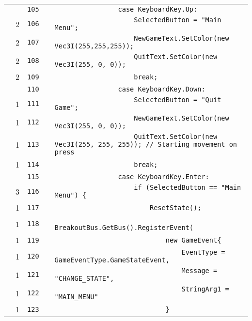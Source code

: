 \documentclass[a4paper,landscape,10pt]{article}
\begin{document}
\begin{longtable}[l]{lrrll}
\cellcolor{gray} &  & \verb~105~ & & \verb~                case KeyboardKey.Up:~\\
\cellcolor{green} & 2 & \verb~106~ & & \verb~                    SelectedButton = "Main Menu";~\\
\cellcolor{green} & 2 & \verb~107~ & & \verb~                    NewGameText.SetColor(new Vec3I(255,255,255));~\\
\cellcolor{green} & 2 & \verb~108~ & & \verb~                    QuitText.SetColor(new Vec3I(255, 0, 0));~\\
\cellcolor{green} & 2 & \verb~109~ & & \verb~                    break;~\\
\cellcolor{gray} &  & \verb~110~ & & \verb~                case KeyboardKey.Down:~\\
\cellcolor{green} & 1 & \verb~111~ & & \verb~                    SelectedButton = "Quit Game";~\\
\cellcolor{green} & 1 & \verb~112~ & & \verb~                    NewGameText.SetColor(new Vec3I(255, 0, 0));~\\
\cellcolor{green} & 1 & \verb~113~ & & \verb~                    QuitText.SetColor(new Vec3I(255, 255, 255)); // Starting movement on press~\\
\cellcolor{green} & 1 & \verb~114~ & & \verb~                    break;~\\
\cellcolor{gray} &  & \verb~115~ & & \verb~                case KeyboardKey.Enter:~\\
\cellcolor{green} & 3 & \verb~116~ & & \verb~                    if (SelectedButton == "Main Menu") {~\\
\cellcolor{green} & 1 & \verb~117~ & & \verb~                        ResetState();~\\
\cellcolor{green} & 1 & \verb~118~ & & \verb~                        BreakoutBus.GetBus().RegisterEvent(~\\
\cellcolor{green} & 1 & \verb~119~ & & \verb~                            new GameEvent{~\\
\cellcolor{green} & 1 & \verb~120~ & & \verb~                                EventType = GameEventType.GameStateEvent,~\\
\cellcolor{green} & 1 & \verb~121~ & & \verb~                                Message = "CHANGE_STATE",~\\
\cellcolor{green} & 1 & \verb~122~ & & \verb~                                StringArg1 = "MAIN_MENU"~\\
\cellcolor{green} & 1 & \verb~123~ & & \verb~                            }~\\

\end{longtable}
\end{document}
